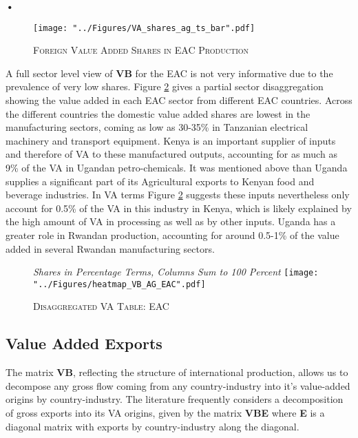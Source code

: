 \textbf{\textbf{•}}\documentclass[a4paper]{article}
\begin{document}
\begin{figure}[h!]
\centering
\caption{\label{fig:EACVB_ts_bar}\textsc{Foreign Value Added Shares in EAC Production}}
\texttt{[image: "../Figures/VA\_shares\_ag\_ts\_bar".pdf]} %
\end{figure}
\FloatBarrier

A full sector level view of \textbf{VB} for the EAC is not very informative due to the prevalence of very low shares. Figure \ref{fig:eacVB} gives a partial sector disaggregation showing the value added in each EAC sector from different EAC countries. Across the different countries the domestic value added shares are lowest in the manufacturing sectors, coming as low as 30-35\%  in Tanzanian electrical machinery and transport equipment. Kenya is an important supplier of inputs and therefore of VA to these manufactured outputs, accounting for as much as 9\% of the VA in Ugandan petro-chemicals. It was mentioned above than Uganda supplies a significant part of its Agricultural exports to Kenyan food and beverage industries. In VA terms Figure \ref{fig:eacVB} suggests these inputs nevertheless only account for 0.5\% of the VA in this industry in Kenya, which is likely explained by the high amount of VA in processing as well as by other inputs. Uganda has a greater role in Rwandan production, accounting for around 0.5-1\% of the value added in several Rwandan manufacturing sectors. 

\begin{figure}[h!]
\centering
\caption{\label{fig:eacVB}\textsc{Disaggregated VA Table: EAC}}
\small{\textit{Shares in Percentage Terms, Columns Sum to 100 Percent}}
\texttt{[image: "../Figures/heatmap\_VB\_AG\_EAC".pdf]} %
\end{figure}
\FloatBarrier


\subsection{Value Added Exports}

The matrix \textbf{VB}, reflecting the structure of international production, allows us to decompose any gross flow coming from any country-industry into it's value-added origins by country-industry. The literature frequently considers a decomposition of gross exports into its VA origins, given by the matrix \textbf{VBE} where \textbf{E} is a diagonal matrix with exports by country-industry along the diagonal. %
\end{document}
